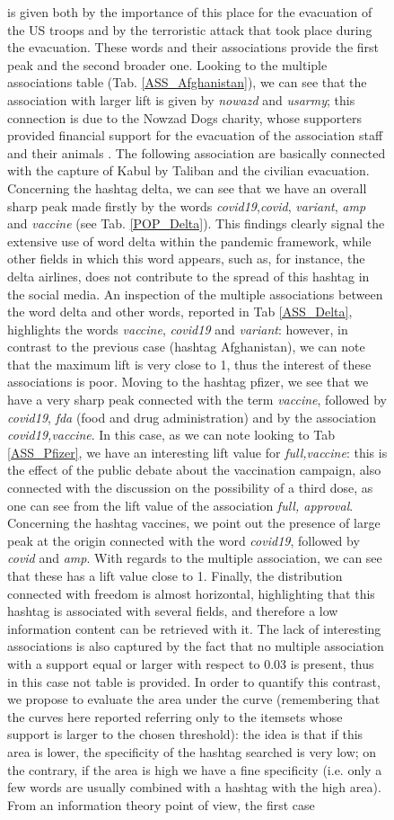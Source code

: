 \documentclass[12pt,%
               a4paper,%
               oneside,openany,%
               titlepage,%
               headinclude,footinclude,%
               BCOR5mm,%
               cleardoublepage=empty,%
               tablecaptionabove,%
               floatperchapter,
               ]{scrreprt}                 %
\begin{document}
\begin{figure}[ht]
\begin{minipage}[b]{0.5\linewidth}
is given both by the importance of this place for the evacuation of the US troops and by the terroristic attack that took place during the evacuation. These words and their associations provide the first peak and the second broader one. Looking to the multiple associations table (Tab. \ref{ASS_Afghanistan}), we can see that the association with larger lift is given by \textit{nowazd} and \textit{usarmy}; this connection is due to the Nowzad Dogs charity, whose supporters provided financial support for the evacuation of the association staff and their animals \cite{Nowzad}. The following association are basically connected with the capture of Kabul by Taliban and the civilian evacuation. Concerning the hashtag delta, we can see that we have an overall sharp peak made firstly by the words \textit{covid19},\textit{covid}, \textit{variant}, \textit{amp} and \textit{vaccine} (see Tab. \ref{POP_Delta}). This findings clearly signal the extensive use of word delta within the pandemic framework, while other fields in which this word appears, such as, for instance, the delta airlines, does not contribute to the spread of this hashtag in the social media. An inspection of the multiple associations between the word delta and other words, reported in Tab \ref{ASS_Delta}, highlights the words \textit{vaccine}, \textit{covid19} and \textit{variant}: however, in contrast to the previous case (hashtag Afghanistan), we can note that the maximum lift is very close to 1, thus the interest of these associations is poor. Moving to the hashtag pfizer, we see that we have a very sharp peak connected with the term \textit{vaccine}, followed by \textit{covid19}, \textit{fda} (food and drug administration) and by the association \textit{covid19,vaccine}. In this case, as we can note looking to Tab \ref{ASS_Pfizer}, we have an interesting lift value for \textit{full,vaccine}: this is the effect of the public debate about the vaccination campaign, also connected with the discussion on the possibility of a third dose, as one can see from the lift value of the association \textit{full, approval}. Concerning the hashtag vaccines, we point out the presence of large peak at the origin connected with the word \textit{covid19}, followed by \textit{covid} and \textit{amp}. With regards to the multiple association, we can see that these has a lift value close to 1. Finally, the distribution connected with freedom is almost horizontal, highlighting that this hashtag is associated with several fields, and therefore a low information content can be retrieved with it. The lack of interesting associations is also captured by the fact that no multiple association with a support equal or larger with respect to 0.03 is present, thus in this case not table is provided. In order to quantify this contrast, we propose to evaluate the area under the curve (remembering that the curves here reported referring only to the itemsets whose support is larger to the chosen threshold): the idea is that if this area is lower, the specificity of the hashtag searched is very low; on the contrary, if the area is high we have a fine specificity (i.e. only a few words are usually combined with a hashtag with the high area). From an information theory point of view, the first case 
\end{minipage}
\end{figure}
\end{document}
